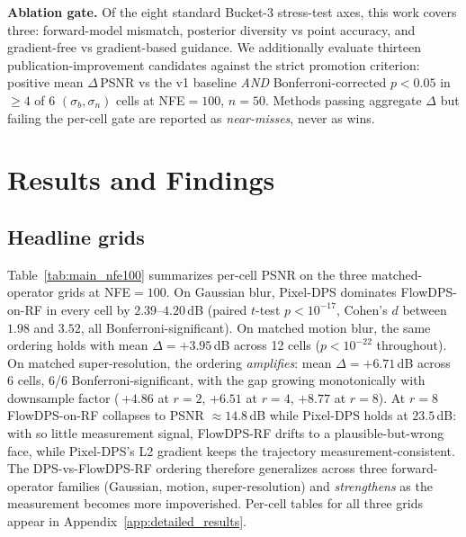 \documentclass{article}
\begin{document}
\textbf{Ablation gate.} Of the eight standard Bucket-3 stress-test
axes, this work covers three: forward-model mismatch, posterior
diversity vs point accuracy, and gradient-free vs gradient-based
guidance. We additionally evaluate thirteen publication-improvement
candidates against the strict promotion criterion: positive mean
$\Delta$\,PSNR vs the v1 baseline \emph{AND} Bonferroni-corrected
$p<0.05$ in $\geq 4$ of $6$ $(\sigma_b, \sigma_n)$ cells at NFE${=}100$,
$n{=}50$. Methods passing aggregate $\Delta$ but failing the per-cell
gate are reported as \emph{near-misses}, never as wins.

\section{Results and Findings}

\subsection{Headline grids}

Table~\ref{tab:main_nfe100} summarizes per-cell PSNR on the three
matched-operator grids at NFE${=}100$. On Gaussian blur, Pixel-DPS
dominates FlowDPS-on-RF in every cell by $2.39$--$4.20$\,dB
(paired $t$-test $p<10^{-17}$, Cohen's $d$ between $1.98$ and $3.52$,
all Bonferroni-significant). On matched motion blur, the same
ordering holds with mean $\Delta{=}{+}3.95$\,dB across 12 cells
($p<10^{-22}$ throughout). On matched super-resolution, the ordering
\emph{amplifies}: mean $\Delta{=}{+}6.71$\,dB across 6 cells, 6/6
Bonferroni-significant, with the gap growing monotonically with
downsample factor (\,${+}4.86$ at $r{=}2$, ${+}6.51$ at $r{=}4$,
${+}8.77$ at $r{=}8$). At $r{=}8$ FlowDPS-on-RF collapses to PSNR
$\approx 14.8$\,dB while Pixel-DPS holds at $23.5$\,dB: with so
little measurement signal, FlowDPS-RF drifts to a plausible-but-wrong
face, while Pixel-DPS's L2 gradient keeps the trajectory
measurement-consistent. The DPS-vs-FlowDPS-RF ordering therefore
generalizes across three forward-operator families (Gaussian, motion,
super-resolution) and \emph{strengthens} as the measurement becomes
more impoverished. Per-cell tables for all three grids appear in
Appendix~\ref{app:detailed_results}.
\end{document}
